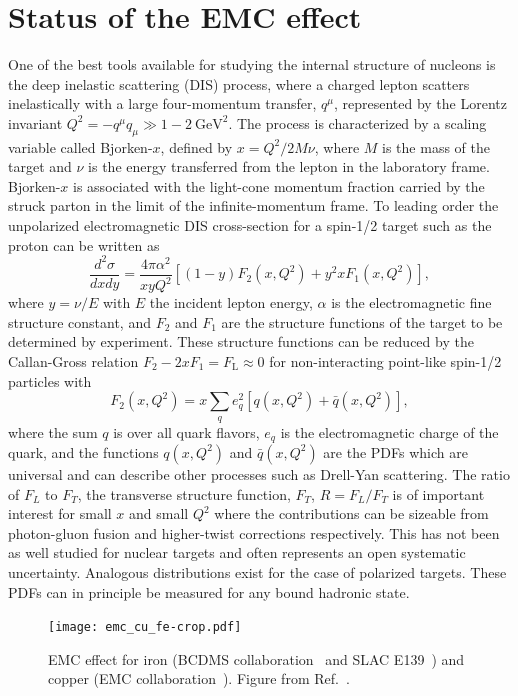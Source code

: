 \section{Status of the EMC effect\label{sec:status}}
%
One of the best tools available for studying the internal structure of nucleons is the deep inelastic
scattering (DIS) process, where a charged lepton scatters inelastically with a large four-momentum
transfer, $q^\mu$, represented by the Lorentz invariant $Q^2 = -q^\mu q_\mu \gg 1-2~\mathrm{GeV}^2$.
The process is characterized by a scaling variable called Bjorken-$x$, defined by $x = Q^2/2M \nu$, 
where $M$ is the mass of the target and $\nu$ is the energy transferred from the lepton in the laboratory frame. Bjorken-$x$ is associated with the light-cone momentum fraction carried by the struck parton in the limit of the infinite-momentum frame. To leading order the unpolarized electromagnetic DIS cross-section for a spin-1/2 target such as the proton can be written as~\cite{PhysRevD.98.030001,Taylor:1991ew}
%
\begin{equation}
\frac{d^2 \sigma}{dx dy} = \frac{4 \pi \alpha^2}{x y Q^2} \left[ (1-y)F_2(x, Q^2) + y^2 x F_1(x, Q^2) \right],
\end{equation}
%
where $y = \nu/E$ with $E$ the incident lepton energy, $\alpha$ is the electromagnetic fine structure constant, and $F_2$
and $F_1$ are the structure functions of the target to be determined by experiment. These structure functions can be reduced by the Callan-Gross relation $F_2 - 2xF_1 = F_\mathrm{L} \approx 0$ for non-interacting point-like spin-1/2 particles with
%
\begin{equation}
F_2(x,Q^2) = x \sum_{q} e_q^2 \left[q(x,Q^2) + \bar{q}(x,Q^2)\right],
\end{equation}
%
where the sum $q$ is over all quark flavors,  $e_q$ is the electromagnetic charge of the quark, and the functions $q(x,Q^2)$ and $\bar{q}(x,Q^2)$ are the PDFs which are universal and can describe other processes such as Drell-Yan scattering.  The ratio of $F_L$ to $F_T$, the transverse structure function, $F_T$,  $R = F_L/F_T$ is of important interest for small $x$ and small $Q^2$ where the contributions can be sizeable from photon-gluon fusion and higher-twist corrections respectively.  This has not been as well studied for nuclear targets and often represents an open systematic uncertainty.  Analogous distributions exist for the case of polarized targets. These PDFs can in principle be measured for any bound hadronic state.

\begin{figure}[tbp]
\centering\texttt{[image: emc\_cu\_fe-crop.pdf]}
\caption{EMC effect for iron (BCDMS collaboration~\cite{Benvenuti:1987az} and SLAC E139~\cite{Gomez:1993ri}) and copper (EMC collaboration~\cite{Ashman:1992kv}).
Figure from Ref.~\cite{Guzey:2012yk}.}
\label{fig:emc_iron}
\end{figure}

